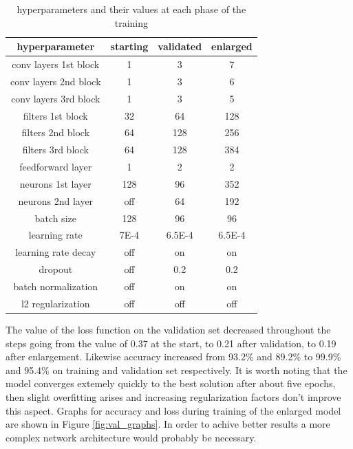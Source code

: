 \documentclass[12pt]{article}
\begin{document}
\begin{table}
	\centering
	\begin{tabular}{|c|c|c|c|} 
		\hline
		\textbf{hyperparameter} & \textbf{starting} & \textbf{validated} & \textbf{enlarged}\\
		\hline
		conv layers 1st block & 1 & 3 & 7\\
		conv layers 2nd block & 1 & 3 & 6\\ 
		conv layers 3rd block & 1 & 3 & 5\\ 
		filters 1st block & 32 & 64 & 128\\
		filters 2nd block & 64 & 128 & 256\\
		filters 3rd block & 64 & 128 & 384\\ 
		feedforward layer & 1 & 2 & 2\\
		neurons 1st layer & 128 & 96 & 352\\
		neurons 2nd layer & off & 64 & 192\\
		batch size & 128 & 96 & 96\\
		learning rate & 7E-4 & 6.5E-4 & 6.5E-4\\
		learning rate decay & off & on & on\\
		dropout & off & 0.2 & 0.2\\
		batch normalization & off & on & on\\
		l2 regularization & off & off & off\\
		\hline
	\end{tabular}
	\caption{hyperparameters and their values at each phase of the training}
	\label{tab:def-hyper}
\end{table}

The value of the loss function on the validation set decreased throughout the steps going from the value of 0.37 at the start, to 0.21 after validation, to 0.19 after enlargement. Likewise accuracy increased from 93.2\% and 89.2\% to 99.9\% and 95.4\% on training and validation set respectively. It is worth noting that the model converges extemely quickly to the best solution after about five epochs, then slight overfitting arises and increasing regularization factors don't improve this aspect. Graphs for accuracy and loss during training of the enlarged model are shown in Figure \ref{fig:val_graphs}. In order to achive better results a more complex network architecture would probably be necessary.
\end{document}

